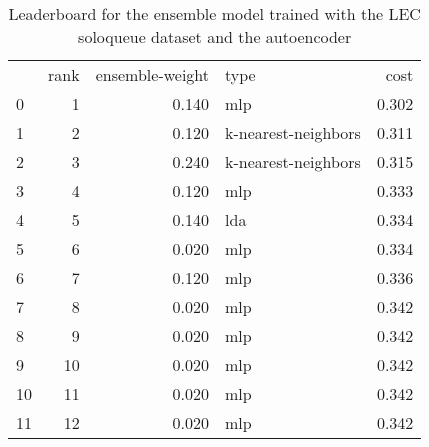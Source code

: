 \begin{table}[]
	\centering
	\begin{tabular}{lrrlr}
		   & rank & ensemble-weight & type                & cost  \\
		0  & 1    & 0.140           & mlp                 & 0.302 \\
		1  & 2    & 0.120           & k-nearest-neighbors & 0.311 \\
		2  & 3    & 0.240           & k-nearest-neighbors & 0.315 \\
		3  & 4    & 0.120           & mlp                 & 0.333 \\
		4  & 5    & 0.140           & lda                 & 0.334 \\
		5  & 6    & 0.020           & mlp                 & 0.334 \\
		6  & 7    & 0.120           & mlp                 & 0.336 \\
		7  & 8    & 0.020           & mlp                 & 0.342 \\
		8  & 9    & 0.020           & mlp                 & 0.342 \\
		9  & 10   & 0.020           & mlp                 & 0.342 \\
		10 & 11   & 0.020           & mlp                 & 0.342 \\
		11 & 12   & 0.020           & mlp                 & 0.342 \\
	\end{tabular}

	\caption{Leaderboard for the ensemble model trained with the LEC soloqueue dataset and the autoencoder}
	\label{tab:lb-lec-games-full-autoencode}
\end{table}

